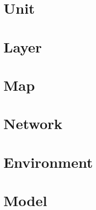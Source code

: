 


\section{Unit}
\section{Layer}
\section{Map}
\section{Network}
\section{Environment}
\section{Model}